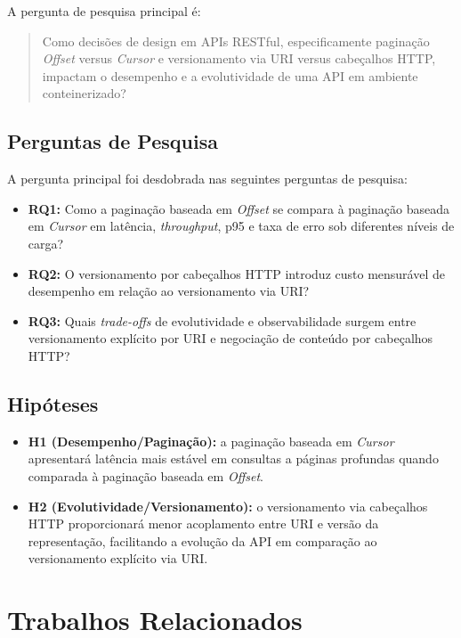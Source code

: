 \documentclass[journal]{IEEEtran}
\begin{document}
A pergunta de pesquisa principal é:

\begin{quote}
Como decisões de design em APIs RESTful, especificamente paginação \textit{Offset} versus \textit{Cursor} e versionamento via URI versus cabeçalhos HTTP, impactam o desempenho e a evolutividade de uma API em ambiente conteinerizado?
\end{quote}


\subsection{Perguntas de Pesquisa}

A pergunta principal foi desdobrada nas seguintes perguntas de pesquisa:

\begin{itemize}
    \item \textbf{RQ1:} Como a paginação baseada em \textit{Offset} se compara à paginação baseada em \textit{Cursor} em latência, \textit{throughput}, p95 e taxa de erro sob diferentes níveis de carga?
    \item \textbf{RQ2:} O versionamento por cabeçalhos HTTP introduz custo mensurável de desempenho em relação ao versionamento via URI?
    \item \textbf{RQ3:} Quais \textit{trade-offs} de evolutividade e observabilidade surgem entre versionamento explícito por URI e negociação de conteúdo por cabeçalhos HTTP?
\end{itemize}

\subsection{Hipóteses}

\begin{itemize}
    \item \textbf{H1 (Desempenho/Paginação):} a paginação baseada em \textit{Cursor} apresentará latência mais estável em consultas a páginas profundas quando comparada à paginação baseada em \textit{Offset}.
    \item \textbf{H2 (Evolutividade/Versionamento):} o versionamento via cabeçalhos HTTP proporcionará menor acoplamento entre URI e versão da representação, facilitando a evolução da API em comparação ao versionamento explícito via URI.
\end{itemize}

\section{Trabalhos Relacionados}
\end{document}
